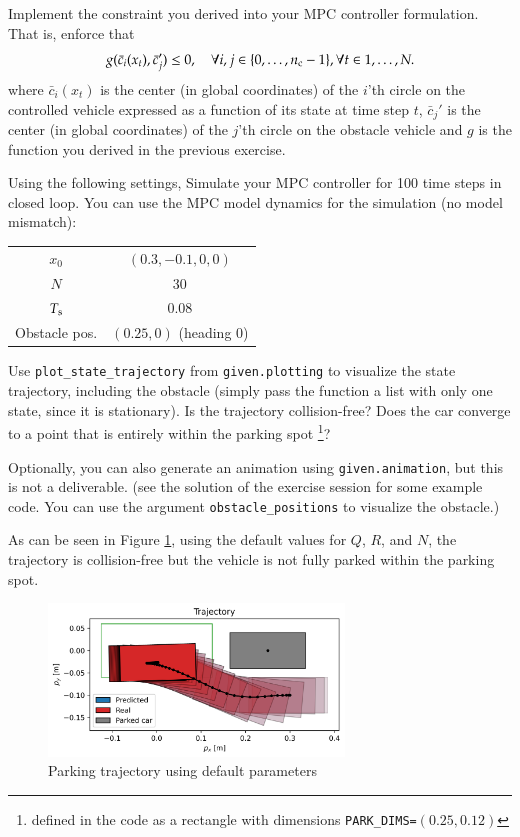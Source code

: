\documentclass[]{article}
\begin{document}
\begin{assignment}
	Implement the constraint you derived into your MPC controller formulation.
	That is, enforce that 
	\[
		g(\bar{c}_i(x_t), \bar{c}_j') \leq 0, \quad \forall i,j \in \{0, \dots, n_{\mathrm{c}}-1\}, \forall t \in 1, \dots, N. 
	\]
	where $\bar{c}_{i}(x_t)$ is the center (in global coordinates) of the $i$'th circle on the 
	controlled vehicle expressed as a function of its state at time step $t$,
	$\bar{c}_j'$ is the center (in global coordinates) of the $j$'th circle 
	on the obstacle vehicle and $g$ is the function you derived in the previous 
	exercise.

	Using the following settings, Simulate your MPC controller for 100 time steps in closed loop.
	You can use the MPC model dynamics for the simulation (no model mismatch):
	
	\begin{center}
	\begin{tabular}{cc}
		\toprule
		$x_0$ & $(0.3, -0.1, 0, 0)$ \\
		$N$   & 30 \\ 
		$T_{\mathrm{s}}$ & 0.08 \\ 
		Obstacle pos. & $(0.25, 0)$ (heading 0)\\
		\bottomrule
	\end{tabular}
	\end{center}
	
	Use \texttt{plot\_state\_trajectory} from \texttt{given.plotting} to 
	visualize the state trajectory, including the obstacle (simply pass the function a list with only one state, since it is stationary).
	Is the trajectory collision-free? 
	Does the car converge to a point that is entirely within the parking spot
	\footnote{
	defined in the code as a rectangle with dimensions \texttt{PARK\_DIMS=}$(0.25, 0.12)$
	}?

	Optionally, you can also generate an animation using \texttt{given.animation}, but this is 
	not a deliverable.
	(see the solution of the exercise session for some example code. You can use the argument \texttt{obstacle\_positions} to visualize the obstacle.)
\end{assignment}
\begin{flushleft}
	As can be seen in Figure \ref{fig:assignment4_4}, using the default values for $Q$, $R$, and $N$, the trajectory is collision-free but the vehicle is not fully parked within the parking spot.
\end{flushleft}
\begin{figure}[H]
    \centering
    \includegraphics[width=0.7\textwidth]{images/Assignment_44.png}
    \caption{Parking trajectory using default parameters}
    \label{fig:assignment4_4}
\end{figure}
\end{document}

